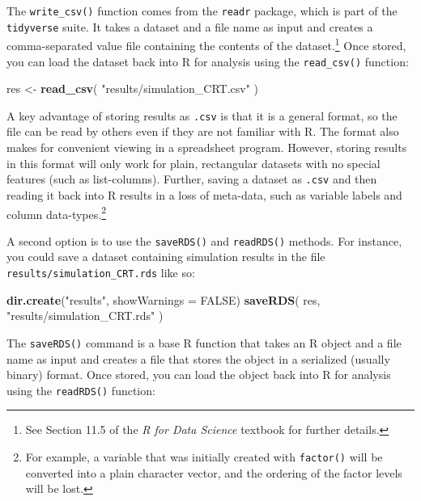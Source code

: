 \documentclass[
]{book}
\newenvironment{Shaded}{\begin{snugshade}}{\end{snugshade}}
\newcommand{\AttributeTok}[1]{\textcolor[rgb]{0.13,0.29,0.53}{#1}}
\newcommand{\ConstantTok}[1]{\textcolor[rgb]{0.56,0.35,0.01}{#1}}
\newcommand{\FunctionTok}[1]{\textcolor[rgb]{0.13,0.29,0.53}{\textbf{#1}}}
\newcommand{\NormalTok}[1]{#1}
\newcommand{\OtherTok}[1]{\textcolor[rgb]{0.56,0.35,0.01}{#1}}
\newcommand{\StringTok}[1]{\textcolor[rgb]{0.31,0.60,0.02}{#1}}
\begin{document}
The \texttt{write\_csv()} function comes from the \texttt{readr} package, which is part of the \texttt{tidyverse} suite.
It takes a dataset and a file name as input and creates a comma-separated value file containing the contents of the dataset.\footnote{See Section 11.5 of the \emph{R for Data Science} textbook \citep{Wickham2023data} for further details.}
Once stored, you can load the dataset back into R for analysis using the \texttt{read\_csv()} function:

\begin{Shaded}
\begin{Highlighting}[]
\NormalTok{res }\OtherTok{\textless{}{-}} \FunctionTok{read\_csv}\NormalTok{( }\StringTok{"results/simulation\_CRT.csv"}\NormalTok{ )}
\end{Highlighting}
\end{Shaded}

A key advantage of storing results as \texttt{.csv} is that it is a general format, so the file can be read by others even if they are not familiar with R.
The format also makes for convenient viewing in a spreadsheet program.
However, storing results in this format will only work for plain, rectangular datasets with no special features (such as list-columns).
Further, saving a dataset as \texttt{.csv} and then reading it back into R results in a loss of meta-data, such as variable labels and column data-types.\footnote{For example, a variable that was initially created with \texttt{factor()} will be converted into a plain character vector, and the ordering of the factor levels will be lost.}

A second option is to use the \texttt{saveRDS()} and \texttt{readRDS()} methods.
For instance, you could save a dataset containing simulation results in the file \texttt{results/simulation\_CRT.rds} like so:

\begin{Shaded}
\begin{Highlighting}[]
\FunctionTok{dir.create}\NormalTok{(}\StringTok{"results"}\NormalTok{, }\AttributeTok{showWarnings =} \ConstantTok{FALSE}\NormalTok{)}
\FunctionTok{saveRDS}\NormalTok{( res, }\StringTok{"results/simulation\_CRT.rds"}\NormalTok{ )}
\end{Highlighting}
\end{Shaded}

The \texttt{saveRDS()} command is a base R function that takes an R object and a file name as input and creates a file that stores the object in a serialized (usually binary) format.
Once stored, you can load the object back into R for analysis using the \texttt{readRDS()} function:
\end{document}
